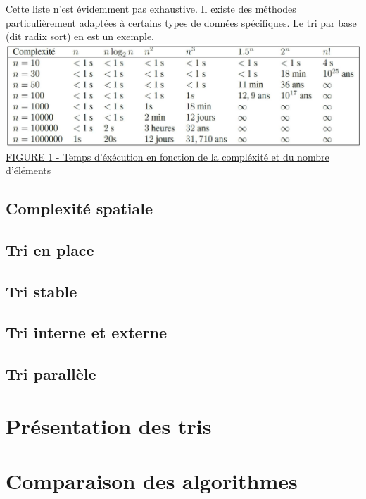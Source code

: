 \documentclass[11pt,a4paper]{article}
\begin{document}
\begin{itemize}
          Cette liste n’est évidemment pas exhaustive. Il existe des méthodes particulièrement adaptées à certains types de données spécifiques.
          Le tri par base (dit radix sort) en est un exemple.
          \newline
          \newline
          \includegraphics[scale = 0.5]{O(n).jpg}
          \underline {FIGURE 1 - Temps d'éxécution en fonction de la compléxité et du nombre d'éléments}


\end{itemize}

\subsection{Complexité spatiale}

\subsection{Tri en place}

\subsection{Tri stable}

\subsection{Tri interne et externe}

\subsection{Tri parallèle}

\section{Présentation des tris}

\section{Comparaison des algorithmes}
\end{document}
